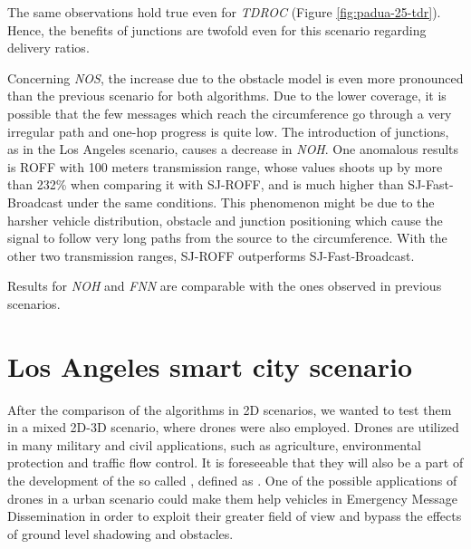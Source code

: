 		
		The same observations hold true even for \textit{TDROC} (Figure 	\ref{fig:padua-25-tdr}). Hence, the benefits of junctions are twofold even for this scenario regarding delivery ratios.
		
		
		Concerning \textit{NOS}, the increase due to the obstacle model is even more pronounced than the previous scenario for both algorithms. Due to the lower coverage, it is possible that the few messages which reach the circumference go through a very irregular path and  one-hop progress is quite low. The introduction of junctions, as in the Los Angeles scenario, causes a decrease in \textit{NOH}. One anomalous results is ROFF with 100 meters transmission range, whose values shoots up by more than 232\% when comparing it with SJ-ROFF, and is much higher than SJ-Fast-Broadcast under the same conditions. This phenomenon might be due to the harsher vehicle distribution, obstacle and junction positioning which cause the signal to follow very long paths from the source to the circumference. With the other two transmission ranges, SJ-ROFF outperforms SJ-Fast-Broadcast.
		
		
		Results for \textit{NOH} and \textit{FNN} are comparable with the ones observed in previous scenarios.
		
		
	\section{Los Angeles smart city scenario}
		After the comparison of the algorithms in 2D scenarios, we wanted to test them in a mixed 2D-3D scenario, where drones were also employed. Drones are utilized in many military and civil applications, such as agriculture, environmental protection and traffic flow control. It is foreseeable that they will also be a part of the development of the so called , defined as \cite{smartCity}. One of the possible applications of drones in a urban scenario could make them help vehicles in Emergency Message Dissemination in order to exploit their greater field of view and bypass the effects of ground level shadowing and obstacles. 
		

